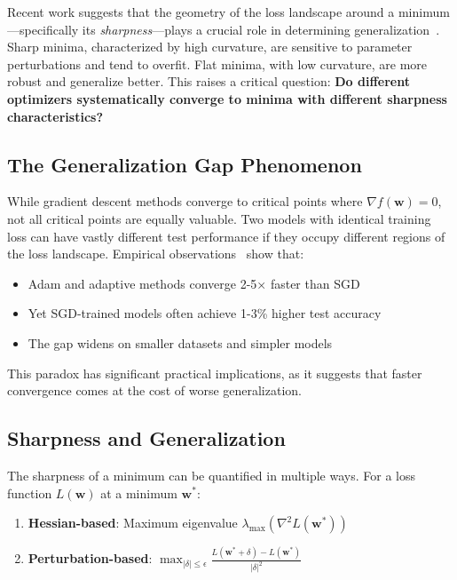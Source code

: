 \documentclass[12pt,a4paper]{article}
\begin{document}
Recent work suggests that the geometry of the loss landscape around a minimum—specifically its \emph{sharpness}—plays a crucial role in determining generalization~\cite{keskar2016large}. Sharp minima, characterized by high curvature, are sensitive to parameter perturbations and tend to overfit. Flat minima, with low curvature, are more robust and generalize better. This raises a critical question: \textbf{Do different optimizers systematically converge to minima with different sharpness characteristics?}

\subsection{The Generalization Gap Phenomenon}

While gradient descent methods converge to critical points where $\nabla f(\mathbf{w}) = 0$, not all critical points are equally valuable. Two models with identical training loss can have vastly different test performance if they occupy different regions of the loss landscape. Empirical observations~\cite{wilson2017marginal} show that:

\begin{itemize}
    \item Adam and adaptive methods converge 2-5× faster than SGD
    \item Yet SGD-trained models often achieve 1-3\% higher test accuracy
    \item The gap widens on smaller datasets and simpler models
\end{itemize}

This paradox has significant practical implications, as it suggests that faster convergence comes at the cost of worse generalization.

\subsection{Sharpness and Generalization}

The sharpness of a minimum can be quantified in multiple ways. For a loss function $L(\mathbf{w})$ at a minimum $\mathbf{w}^*$:

\begin{enumerate}
    \item \textbf{Hessian-based}: Maximum eigenvalue $\lambda_{\max}(\nabla^2 L(\mathbf{w}^*))$
    \item \textbf{Perturbation-based}: $\max_{|\delta| \leq \epsilon} \frac{L(\mathbf{w}^* + \delta) - L(\mathbf{w}^*)}{|\delta|^2}$
\end{enumerate}
\end{document}
